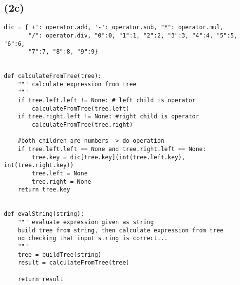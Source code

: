 \documentclass[a4paper]{article}
\begin{document}
\subsection*{(2c)}


\begin{verbatim}
dic = {'+': operator.add, '-': operator.sub, "*": operator.mul, 
       "/": operator.div, "0":0, "1":1, "2":2, "3":3, "4":4, "5":5, "6":6,
       "7":7, "8":8, "9":9}


def calculateFromTree(tree):
    """ calculate expression from tree
    """
    if tree.left.left != None: # left child is operator
        calculateFromTree(tree.left)
    if tree.right.left != None: #right child is operator
        calculateFromTree(tree.right)

    #both children are numbers -> do operation
    if tree.left.left == None and tree.right.left == None:                    
        tree.key = dic[tree.key](int(tree.left.key), int(tree.right.key))
        tree.left = None
        tree.right = None
    return tree.key


def evalString(string):
    """ evaluate expression given as string
    build tree from string, then calculate expression from tree
    no checking that input string is correct...
    """
    tree = buildTree(string)
    result = calculateFromTree(tree)

    return result
\end{verbatim}


\end{document}
